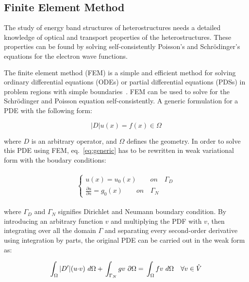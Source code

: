 \subsection{Finite Element Method}\label{sec:FEM}

The study of energy band structures of heterostructures needs a detailed
knowledge of optical and transport properties of the heterostructures. These
properties can be found by solving self-consistently Poisson's and
Schr{\"o}dinger's equations for the electron wave functions.


The finite element method (FEM) is a simple and efficient method for solving
ordinary differential equations (ODEs) or partial differential equations (PDSs)
in problem regions with simple boundaries~\cite{bathe2006finite}. FEM can be used to solve for the
Schr{\"o}dinger and Poisson equation self-consistently. A generic formulation for a PDE with the following form: 

\begin{equation}
  |D|u(x) = f(x)\in\Omega
  \label{eq:generic}
\end{equation}

where $D$ is an arbitrary operator, and $\Omega$ defines the geometry. In order
to solve this PDE using FEM, eq.~\ref{eq:generic} has to be rewritten in weak
variational form with the boudary conditions:

\begin{eqnarray}
\begin{aligned}
  \left\{
    \begin{array}{ll} 
      u(x) = u_{0}(x) \qquad on \quad \Gamma_D   \\
      \frac{\partial{u}}{\partial{n}} = g_0(x) \qquad on \quad \Gamma_N
    \end{array}
  \right.
\end{aligned}
\label{eq:generic_BC}
\end{eqnarray}

where $\Gamma_D$ and $\Gamma_N$ signifies Dirichlet and Neumann boundary
condition. By introducing an arbitrary function $v$ and multiplying the PDF
with $v$, then integrating over all the domain $\Gamma$ and separating every
second-order derivative using integration by parts, the original PDE can be
carried out in the weak form as:

\begin{equation}
  \int_{\Omega}|D^\prime|(u{\cdot}v)\ d\Omega + \\
  \int_{\Gamma_N}gv\ \partial\Omega = \\
  \int_{\Omega}fv\ d\Omega \quad \forall v \in \hat{V}\\
  \label{eq:weakPDE}
\end{equation}

